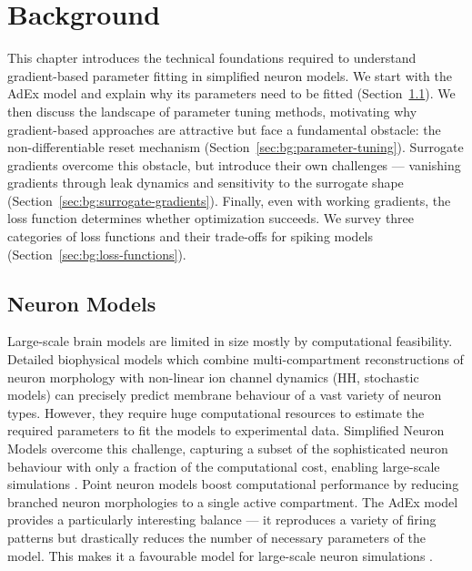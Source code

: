\chapter{Background}\label{ch:background}
\glsresetall
This chapter introduces the technical foundations required to understand gradient-based parameter fitting in simplified neuron models.
We start with the \gls{AdEx} model and explain why its parameters need to be fitted (Section~\ref{sec:bg:neuron-models}).
We then discuss the landscape of parameter tuning methods, motivating why gradient-based approaches are attractive but face a fundamental obstacle:
the non-differentiable reset mechanism (Section~\ref{sec:bg:parameter-tuning}).
Surrogate gradients overcome this obstacle, but introduce their own challenges --- vanishing gradients through leak dynamics and sensitivity to the surrogate shape (Section~\ref{sec:bg:surrogate-gradients}).
Finally, even with working gradients, the loss function determines whether optimization succeeds.
We survey three categories of loss functions and their trade-offs for spiking models (Section~\ref{sec:bg:loss-functions}).

\section{Neuron Models}\label{sec:bg:neuron-models}
Large-scale brain models are limited in size mostly by computational feasibility.
Detailed biophysical models which combine multi-compartment reconstructions of neuron morphology
with non-linear ion channel dynamics (\gls{HH}, stochastic models)
can precisely predict membrane behaviour of a vast variety of neuron types.
However, they require huge computational resources to estimate the required parameters to fit the models to experimental data.
Simplified Neuron Models overcome this challenge, capturing a subset of the sophisticated neuron behaviour with only a fraction of the computational cost, enabling large-scale simulations \cite{Gerstner2014}.
Point neuron models boost computational performance by reducing branched neuron morphologies to a single active compartment.
The \gls{AdEx} model \cite{Naud2008} provides a particularly interesting balance --- it reproduces a variety of firing patterns but drastically reduces the number of necessary parameters of the model.
This makes it a favourable model for large-scale neuron simulations \cite{Tesler2024}.

